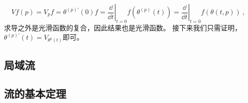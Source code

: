 \begin{equation}
Vf(p)=V_pf=\theta^{(p)\prime}(0)f=\left.\frac{\dd}{\dd t}\right|_{t=0} f\left(\theta^{(p)}(t)\right)=\left.\frac{\dd}{\dd t}\right|_{t=0} f(\theta(t, p)) ~,
\end{equation}
求导之外是光滑函数的复合，因此结果也是光滑函数。
接下来我们只需证明，$\theta^{(p) \prime}(t)=V_{\theta^{p}(t)}$即可。
\subsection{局域流}
\subsection{流的基本定理}
